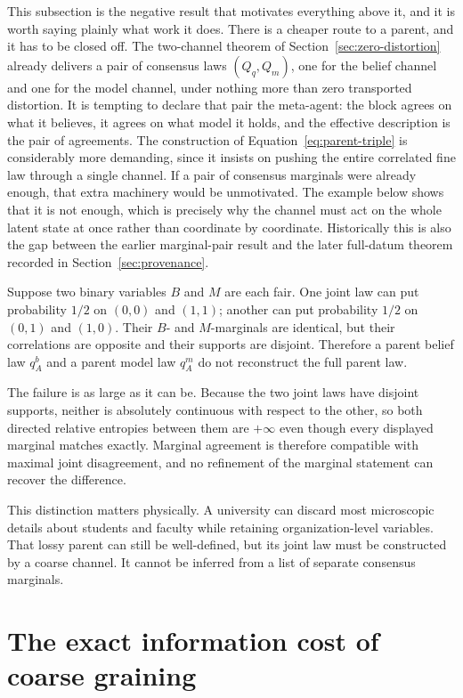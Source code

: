 \documentclass[11pt,letterpaper]{article}
\begin{document}
This subsection is the negative result that motivates everything above it, and it is worth saying plainly what work it does. There is a cheaper route to a parent, and it has to be closed off. The two-channel theorem of Section~\ref{sec:zero-distortion} already delivers a pair of consensus laws \((Q_q,Q_m)\), one for the belief channel and one for the model channel, under nothing more than zero transported distortion. It is tempting to declare that pair the meta-agent: the block agrees on what it believes, it agrees on what model it holds, and the effective description is the pair of agreements. The construction of Equation~\eqref{eq:parent-triple} is considerably more demanding, since it insists on pushing the entire correlated fine law through a single channel. If a pair of consensus marginals were already enough, that extra machinery would be unmotivated. The example below shows that it is not enough, which is precisely why the channel must act on the whole latent state at once rather than coordinate by coordinate. Historically this is also the gap between the earlier marginal-pair result and the later full-datum theorem recorded in Section~\ref{sec:provenance}.

Suppose two binary variables \(B\) and \(M\) are each fair. One joint law can put probability \(1/2\) on \((0,0)\) and \((1,1)\); another can put probability \(1/2\) on \((0,1)\) and \((1,0)\). Their \(B\)- and \(M\)-marginals are identical, but their correlations are opposite and their supports are disjoint. Therefore a parent belief law \(q_A^b\) and a parent model law \(q_A^m\) do not reconstruct the full parent law.

The failure is as large as it can be. Because the two joint laws have disjoint supports, neither is absolutely continuous with respect to the other, so both directed relative entropies between them are \(+\infty\) even though every displayed marginal matches exactly. Marginal agreement is therefore compatible with maximal joint disagreement, and no refinement of the marginal statement can recover the difference.

This distinction matters physically. A university can discard most microscopic details about students and faculty while retaining organization-level variables. That lossy parent can still be well-defined, but its joint law must be constructed by a coarse channel. It cannot be inferred from a list of separate consensus marginals.

\section{The exact information cost of coarse graining}
\label{sec:info-cost}
\end{document}
